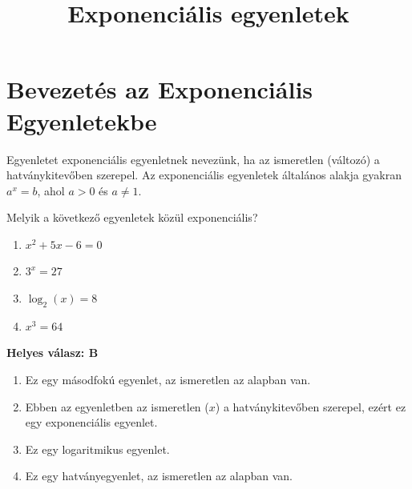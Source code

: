 \documentclass[a4paper,12pt]{article}
\theoremstyle{definition} %
\begin{document}
\title{Exponenciális egyenletek}
\author{} %
\date{}   %

\maketitle

\thispagestyle{empty} %

\section*{Bevezetés az Exponenciális Egyenletekbe}

\begin{definiciodoboz}
Egyenletet exponenciális egyenletnek nevezünk, ha az ismeretlen (változó) a hatványkitevőben szerepel.
Az exponenciális egyenletek általános alakja gyakran $a^x = b$, ahol $a > 0$ és $a \neq 1$.
\end{definiciodoboz}

\begin{feladatdoboz}
Melyik a következő egyenletek közül exponenciális?
\begin{enumerate}[label=(\Alph*)]
    \item $x^2 + 5x - 6 = 0$
    \item $3^x = 27$
    \item $\log_2(x) = 8$
    \item $x^3 = 64$
\end{enumerate}
\end{feladatdoboz}

\begin{megoldasdoboz}
\textbf{Helyes válasz: B}
\begin{enumerate}[label=(\Alph*)]
    \item Ez egy másodfokú egyenlet, az ismeretlen az alapban van.
    \item Ebben az egyenletben az ismeretlen ($x$) a hatványkitevőben szerepel, ezért ez egy exponenciális egyenlet.
    \item Ez egy logaritmikus egyenlet.
    \item Ez egy hatványegyenlet, az ismeretlen az alapban van.
\end{enumerate}
\end{megoldasdoboz}
\end{document}
